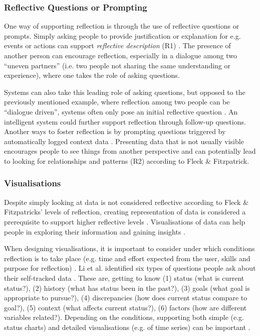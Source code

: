 \subsubsection{Reflective Questions or Prompting}
One way of supporting reflection is through the use of reflective questions or prompts. Simply asking people to provide justification or explanation for e.g. events or actions can support \textit{reflective description} (R1) \cite{Fleck}. The presence of another person can encourage reflection, especially in a dialogue among two “uneven partners” (i.e. two people not sharing the same understanding or experience), where one takes the role of asking questions. 

Systems can also take this leading role of asking questions, but opposed to the previously mentioned example, where reflection among two people can be “dialogue driven”, systems often only pose an initial reflective question \cite{Mols}. An intelligent system could further support reflection through follow-up questions. Another ways to foster reflection is by prompting questions triggered by automatically logged context data \cite{Fleck}. Presenting data that is not usually visible encourages people to see things from another perspective and can potentially lead to looking for relationships and patterns (R2) according to Fleck \& Fitzpatrick. 

\subsubsection{Visualisations}
Despite simply looking at data is not considered reflective according to Fleck \& Fitzpatricks’ levels of reflection, creating representation of data is considered a prerequisite to support higher reflective levels \cite{Fleck}. Visualisations of data can help people in exploring their information and gaining insights \cite{Li2010, Choe2014}. 

When designing visualisations, it is important to consider under which conditions reflection is to take place (e.g. time and effort expected from the user, skills and purpose for reflection) \cite{Cuttone, Muller}. Li et al. identified six types of questions people ask about their self-tracked data \cite{Li2011}. These are, getting to know (1) status (what is current status?), (2) history (what has status been in the past?), (3) goals (what goal is appropriate to pursue?), (4) discrepancies (how does current status compare to goal?), (5) context (what affects current status?), (6) factors (how are different variables related?). Depending on the conditions, supporting both simple (e.g. status charts) and detailed visualisations (e.g. of time series) can be important \cite{Muller, Cuttone}.

